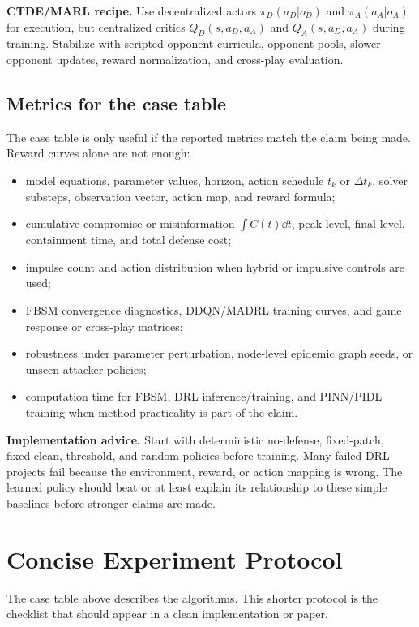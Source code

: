 \documentclass[11pt,a4paper]{article}
\begin{document}
\begin{methodbox}
\textbf{CTDE/MARL recipe.}
Use decentralized actors $\pi_D(a_D|o_D)$ and $\pi_A(a_A|o_A)$ for execution, but centralized critics $Q_D(s,a_D,a_A)$ and $Q_A(s,a_D,a_A)$ during training. Stabilize with scripted-opponent curricula, opponent pools, slower opponent updates, reward normalization, and cross-play evaluation.
\end{methodbox}

\subsection{Metrics for the case table}
The case table is only useful if the reported metrics match the claim being made. Reward curves alone are not enough:
\begin{itemize}
\item model equations, parameter values, horizon, action schedule $t_k$ or $\Delta t_k$, solver substeps, observation vector, action map, and reward formula;
\item cumulative compromise or misinformation $\int C(t)\dd t$, peak level, final level, containment time, and total defense cost;
\item impulse count and action distribution when hybrid or impulsive controls are used;
\item FBSM convergence diagnostics, DDQN/MADRL training curves, and game response or cross-play matrices;
\item robustness under parameter perturbation, node-level epidemic graph seeds, or unseen attacker policies;
\item computation time for FBSM, DRL inference/training, and PINN/PIDL training when method practicality is part of the claim.
\end{itemize}

\begin{boxednote}
\textbf{Implementation advice.}
Start with deterministic no-defense, fixed-patch, fixed-clean, threshold, and random policies before training. Many failed DRL projects fail because the environment, reward, or action mapping is wrong. The learned policy should beat or at least explain its relationship to these simple baselines before stronger claims are made.
\end{boxednote}


\section{Concise Experiment Protocol}
The case table above describes the algorithms. This shorter protocol is the checklist that should appear in a clean implementation or paper.
\end{document}
